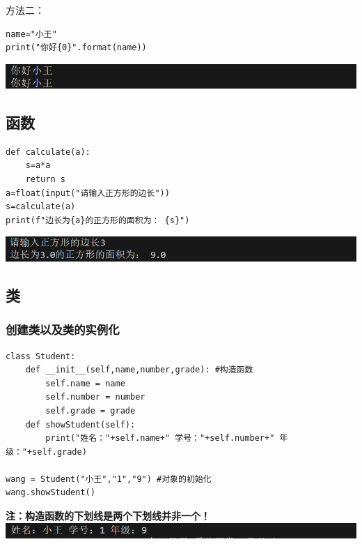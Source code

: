 \documentclass[UTF8,a4paper]{ctexart}
\begin{document}
方法二：
\begin{lstlisting}
name="小王"
print("你好{0}".format(name))
\end{lstlisting}
\includegraphics[width=1\textwidth]{./python/format.png}

\subsection{函数}
\begin{lstlisting}
def calculate(a):
    s=a*a
    return s
a=float(input("请输入正方形的边长"))
s=calculate(a)
print(f"边长为{a}的正方形的面积为： {s}")
\end{lstlisting}
\includegraphics[width=1\textwidth]{./python/function.png}

\subsection{类}
\subsubsection{创建类以及类的实例化}
\begin{lstlisting}
class Student:
    def __init__(self,name,number,grade): #构造函数
        self.name = name
        self.number = number
        self.grade = grade
    def showStudent(self):
        print("姓名："+self.name+" 学号："+self.number+" 年级："+self.grade)

wang = Student("小王","1","9") #对象的初始化
wang.showStudent()
\end{lstlisting}
\textbf{注：构造函数的下划线是两个下划线并非一个！}\\
\includegraphics[width=1\textwidth]{./python/class.png}
\end{document}
